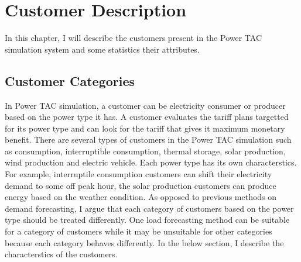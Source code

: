 
\chapter{Customer Description} 

In this chapter, I will describe the customers present in the Power TAC simulation system and some statistics their attributes.

\section{Customer Categories}


In Power TAC simulation, a customer can be electricity consumer or producer based on the power type it has. A customer evaluates the tariff plans targetted for its power type and can look for the tariff that gives it maximum monetary benefit. There are several types of customers in the Power TAC simulation such as consumption, interruptible consumption, thermal storage, solar production, wind production and electric vehicle. Each power type has its own characterstics. For example, interruptile consumption customers can shift their electricity demand to some off peak hour, the solar production customers can produce energy based on the weather condition. As opposed to previous methods on demand forecasting, I argue that each category of customers based on the power type should be treated differently. One load forecasting method can be suitable for a category of customers while it may be unsuitable for other categories because each category behaves differently. In the below section, I describe the characterstics of the customers.

